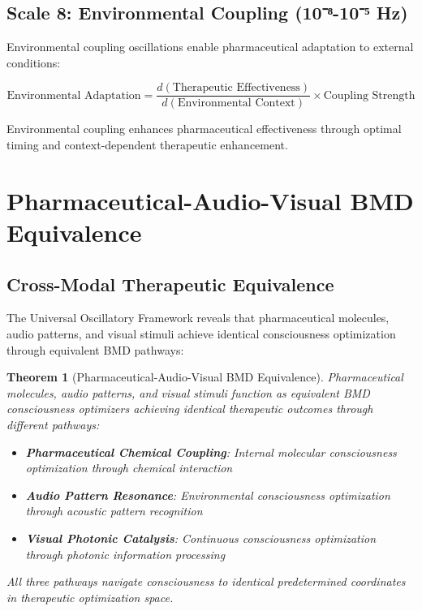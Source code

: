 \documentclass[12pt,a4paper]{article}
\newtheorem{theorem}{Theorem}
\begin{document}
\subsection{Scale 8: Environmental Coupling (10⁻⁸-10⁻⁵ Hz)}

Environmental coupling oscillations enable pharmaceutical adaptation to external conditions:

\begin{equation}
\text{Environmental Adaptation} = \frac{d(\text{Therapeutic Effectiveness})}{d(\text{Environmental Context})} \times \text{Coupling Strength}
\end{equation}

Environmental coupling enhances pharmaceutical effectiveness through optimal timing and context-dependent therapeutic enhancement.

\section{Pharmaceutical-Audio-Visual BMD Equivalence}

\subsection{Cross-Modal Therapeutic Equivalence}

The Universal Oscillatory Framework reveals that pharmaceutical molecules, audio patterns, and visual stimuli achieve identical consciousness optimization through equivalent BMD pathways:

\begin{theorem}[Pharmaceutical-Audio-Visual BMD Equivalence]
Pharmaceutical molecules, audio patterns, and visual stimuli function as equivalent BMD consciousness optimizers achieving identical therapeutic outcomes through different pathways:
\begin{itemize}
\item \textbf{Pharmaceutical Chemical Coupling}: Internal molecular consciousness optimization through chemical interaction
\item \textbf{Audio Pattern Resonance}: Environmental consciousness optimization through acoustic pattern recognition
\item \textbf{Visual Photonic Catalysis}: Continuous consciousness optimization through photonic information processing
\end{itemize}
All three pathways navigate consciousness to identical predetermined coordinates in therapeutic optimization space.
\end{theorem}
\end{document}
